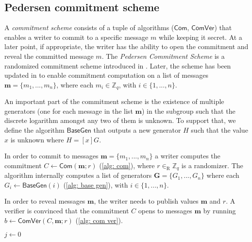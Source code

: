 \subsection{Pedersen commitment scheme}
A \textit{commitment scheme} consists of a tuple of algorithms ($\mathsf{Com}$, $\mathsf{ComVer}$) that enables a writer to commit to a specific message $m$ while keeping it secret. At a later point, if appropriate, the writer has the ability to open the commitment and reveal the committed message $m$. The \textit{Pedersen Commitment Scheme} is a randomized commitment scheme introduced in \cite{Pedersen91-commitment}. Later, the scheme has been updated in \cite{Bootle18} to enable commitment computation on a list of messages $\boldsymbol{m} = \{ m_1, ..., m_n \}$, where each $m_i \in \mathbb{Z}_q$, with $i \in \{ 1, ..., n \}$.

An important part of the commitment scheme is the existence of multiple generators (one for each message in the list  $\boldsymbol{m}$) in the subgroup such that the discrete logarithm amongst any two of them is unknown. To support that, we define the algorithm $\mathsf{BaseGen}$ that outputs a new generator $H$ such that the value $x$ is unknown where $H = [x]G$.

In order to commit to messages $\boldsymbol{m} = \{ m_1, ..., m_n \}$ a writer computes the commitment $C \gets \mathsf{Com}(\boldsymbol{m}; r)$ (\cref{alg: com}), where $r \in_\mathrm{R} \mathbb{Z}_q$ is a randomizer. The algorithm internally computes a list of generators $\boldsymbol{G} = \{ G_1, ..., G_n \}$ where each $G_i \gets \mathsf{BaseGen}(i)$ (\cref{alg: base gen}), with $i \in \{ 1, ..., n \}$.

In order to reveal messages $\boldsymbol{m}$, the writer needs to publish values $\boldsymbol{m}$ and $r$. A verifier is convinced that the commitment $C$ opens to messages $\boldsymbol{m}$ by running $b \gets \mathsf{ComVer}(C, \boldsymbol{m}; r)$ (\cref{alg: com ver}).

\begin{algorithm}[ht]
    \DontPrintSemicolon
    \caption{$\mathsf{BaseGen} (i)$}
    
    $j \gets 0$ \\
     
    
    \label{alg: base gen}
\end{algorithm}

